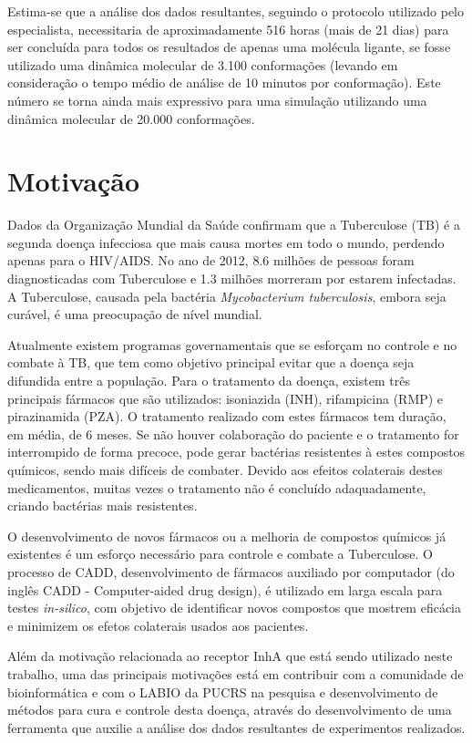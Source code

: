 Estima-se que a análise dos dados resultantes, seguindo o protocolo utilizado pelo especialista, necessitaria de aproximadamente 516 horas (mais de 21 dias) para ser concluída para todos os resultados de apenas uma molécula ligante, se fosse utilizado uma dinâmica molecular de 3.100 conformações (levando em consideração o tempo médio de análise de 10 minutos por conformação). Este número se torna ainda mais expressivo para uma simulação utilizando uma dinâmica molecular de 20.000 conformações.


\section{Motivação}

Dados da Organização Mundial da Saúde confirmam que a Tuberculose (TB) é a segunda doença infecciosa que mais causa mortes em todo o mundo, perdendo apenas para o HIV/AIDS. No ano de 2012, 8.6 milhões de pessoas foram diagnosticadas com Tuberculose e 1.3 milhões morreram por estarem infectadas. A Tuberculose, causada pela bactéria \emph{Mycobacterium tuberculosis}, embora seja curável, é uma preocupação de nível mundial.

Atualmente existem programas governamentais que se esforçam no controle e no combate à TB, que tem como objetivo principal evitar que a doença seja difundida entre a população. Para o tratamento da doença, existem três principais fármacos que são utilizados: isoniazida (INH), rifampicina (RMP) e pirazinamida (PZA). O tratamento realizado com estes fármacos tem duração, em média, de 6 meses. Se não houver colaboração do paciente e o tratamento for interrompido de forma precoce, pode gerar bactérias resistentes à estes compostos químicos, sendo mais difíceis de combater. Devido aos efeitos colaterais destes medicamentos, muitas vezes o tratamento não é concluído adaquadamente, criando bactérias mais resistentes.

O desenvolvimento de novos fármacos ou a melhoria de compostos químicos já existentes é um esforço necessário para controle e combate a Tuberculose. O processo de CADD, desenvolvimento de fármacos auxiliado por computador (do inglês CADD - Computer-aided drug design), é utilizado em larga escala para testes \emph{in-silico}, com objetivo de identificar novos compostos que mostrem eficácia e minimizem os efetos colaterais usados aos pacientes.

Além da motivação relacionada ao receptor InhA que está sendo utilizado neste trabalho, uma das principais motivações está em contribuir com a comunidade de bioinformática e com o LABIO da PUCRS na pesquisa e desenvolvimento de métodos para cura e controle desta doença, através do desenvolvimento de uma ferramenta que auxilie a análise dos dados resultantes de experimentos realizados. 

